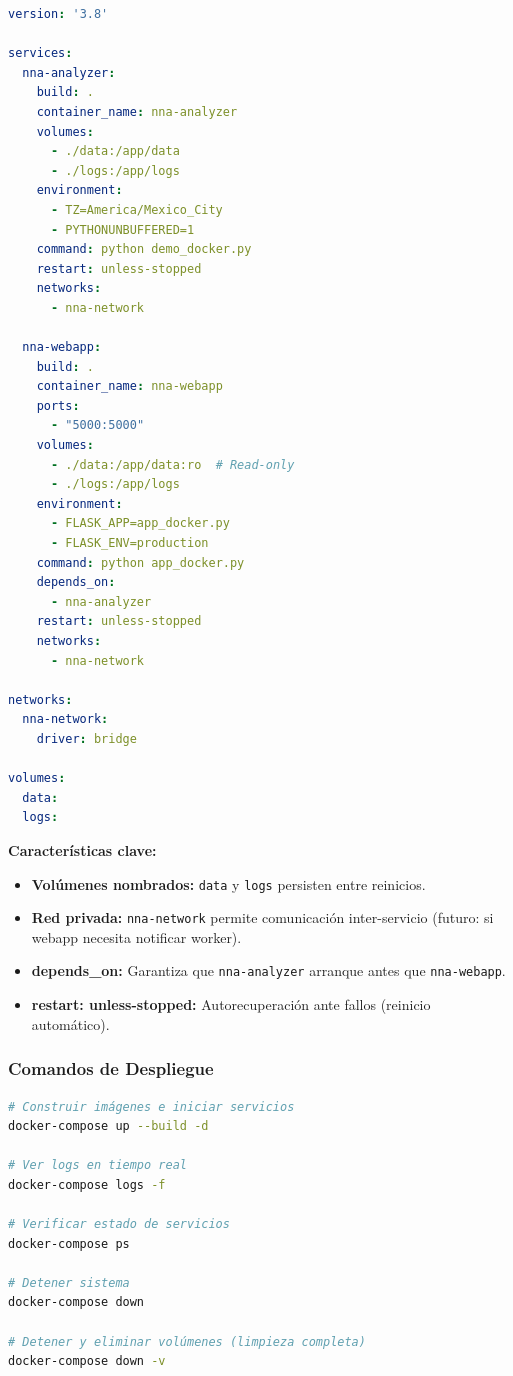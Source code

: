 \begin{lstlisting}[language=yaml, caption={docker-compose.yml completo}]
version: '3.8'

services:
  nna-analyzer:
    build: .
    container_name: nna-analyzer
    volumes:
      - ./data:/app/data
      - ./logs:/app/logs
    environment:
      - TZ=America/Mexico_City
      - PYTHONUNBUFFERED=1
    command: python demo_docker.py
    restart: unless-stopped
    networks:
      - nna-network

  nna-webapp:
    build: .
    container_name: nna-webapp
    ports:
      - "5000:5000"
    volumes:
      - ./data:/app/data:ro  # Read-only
      - ./logs:/app/logs
    environment:
      - FLASK_APP=app_docker.py
      - FLASK_ENV=production
    command: python app_docker.py
    depends_on:
      - nna-analyzer
    restart: unless-stopped
    networks:
      - nna-network

networks:
  nna-network:
    driver: bridge

volumes:
  data:
  logs:
\end{lstlisting}

\textbf{Características clave:}
\begin{itemize}
    \item \textbf{Volúmenes nombrados:} \texttt{data} y \texttt{logs} persisten entre reinicios.
    \item \textbf{Red privada:} \texttt{nna-network} permite comunicación inter-servicio (futuro: si webapp necesita notificar worker).
    \item \textbf{depends\_on:} Garantiza que \texttt{nna-analyzer} arranque antes que \texttt{nna-webapp}.
    \item \textbf{restart: unless-stopped:} Autorecuperación ante fallos (reinicio automático).
\end{itemize}

\subsubsection{Comandos de Despliegue}

\begin{lstlisting}[language=bash, caption={Despliegue del sistema completo}]
# Construir imágenes e iniciar servicios
docker-compose up --build -d

# Ver logs en tiempo real
docker-compose logs -f

# Verificar estado de servicios
docker-compose ps

# Detener sistema
docker-compose down

# Detener y eliminar volúmenes (limpieza completa)
docker-compose down -v
\end{lstlisting}

